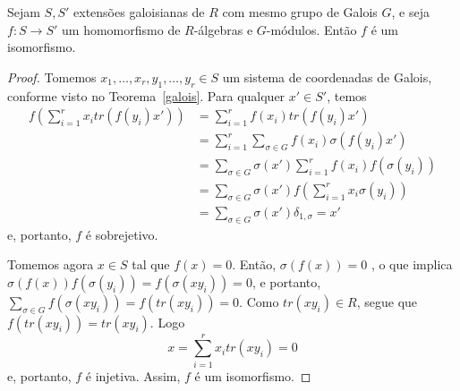 \begin{teo}
Sejam $S,S'$ extensões galoisianas de $R$ com mesmo grupo de Galois $G$, e seja $f: S \rightarrow S'$ um homomorfismo de $R$-álgebras e $G$-módulos. Então $f$ é um isomorfismo.
\begin{proof}
Tomemos $x_1,\dots,x_r,y_1,\dots,y_r \in S$ um sistema de coordenadas de Galois, conforme visto no Teorema~\ref{galois}. Para qualquer $x' \in S'$, temos
\begin{align*}
    f\left(\sum_{i=1}^{r}x_i tr(f(y_i)x')\right) &= \sum_{i=1}^{r}f(x_i)tr(f(y_i)x') \\
    &=\sum_{i=1}^{r}\sum_{\sigma \in G}f(x_i) \sigma(f(y_i)x') \\
    &= \sum_{\sigma \in G} \sigma(x') \sum_{i=1}^{r} f(x_i)f(\sigma(y_i)) \\
    &= \sum_{\sigma \in G}\sigma(x') f\left( \sum_{i=1}^{r} x_i\sigma(y_i) \right)\\
    &=\sum_{\sigma \in G} \sigma(x')\delta_{1,\sigma} = x'
\end{align*}
e, portanto, $f$ é sobrejetivo. \par 
Tomemos agora $x \in S$ tal que $f(x)=0$. Então, $\sigma(f(x)) = 0$ , o que implica $\sigma(f(x))f(\sigma(y_i)) = f(\sigma(xy_i))=0$, e portanto,
$\sum_{\sigma \in G}f(\sigma(xy_i)) = f(tr(xy_i))=0$. Como $tr(xy_i) \in R$, segue que $f(tr(xy_i))=tr(xy_i)$. Logo
\[x= \sum_{i=1}^{r}x_i tr(xy_i)=0\]
e, portanto, $f$ é injetiva. Assim, $f$ é um isomorfismo.
\end{proof}
\end{teo}

